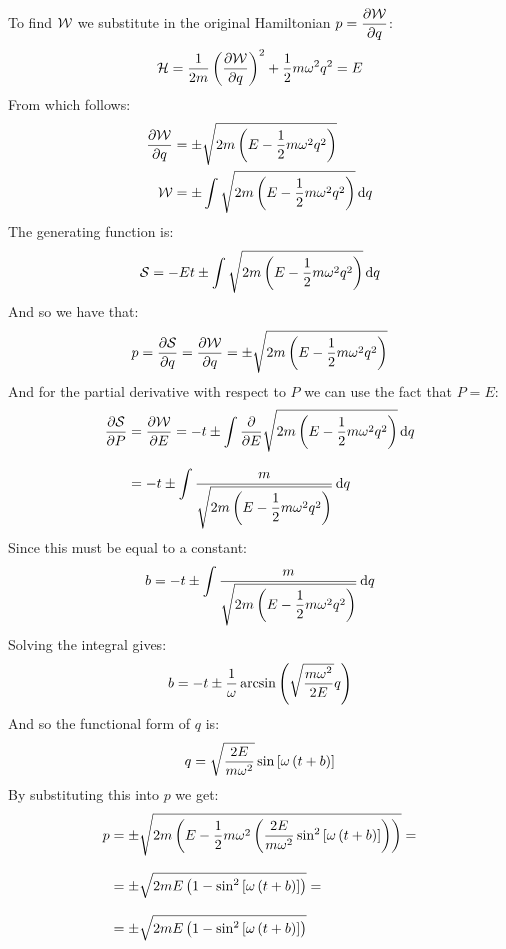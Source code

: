 To find $\mathcal{W}$ we substitute in the original Hamiltonian $p = \pdv{\hamch}{q}$:
\begin{equation}
  \hamfun = \dfrac{1}{2m}\brackets{\pdv{\hamch}{q}}^2 + \dfrac{1}{2}m\omega^2q^2 = E
\end{equation}
From which follows:
\begin{equation}
  \begin{split}
    \pdv{\hamch}{q} &= \pm \sqrt{2m\brackets{E - \dfrac{1}{2}m\omega^2q^2}}\\
    \hamch &= \pm \int  \sqrt{2m\brackets{E - \dfrac{1}{2}m\omega^2q^2}} \dd{q}
  \end{split}
\end{equation}
The generating function is:
\begin{equation}
  \mathcal{S} = -Et \pm \int  \sqrt{2m\left(E - \dfrac{1}{2}m\omega^2q^2\right)} \dd{q}
\end{equation}
And so we have that:
\begin{equation}
  p = \pdv{\action}{q} = \pdv{\hamch}{q} = \pm \sqrt{2m\brackets{E - \dfrac{1}{2}m\omega^2q^2}}
\end{equation}
And for the partial derivative with respect to $P$ we can use the fact that $P=E$:
\begin{equation}
  \begin{split}
    \pdv{\action}{P} &= \pdv{\hamch}{E} = -t \pm \int \pdv{}{E} \sqrt{2m\brackets{E - \dfrac{1}{2}m\omega^2q^2}} \dd{q}\\[8pt]
      &= -t \pm \int \dfrac{m}{\sqrt{2m\brackets{E - \dfrac{1}{2}m\omega^2q^2}}} \dd{q}
  \end{split}
\end{equation}
Since this must be equal to a constant:
\begin{equation}
  b = -t \pm \int \dfrac{m}{\sqrt{2m\left(E - \dfrac{1}{2}m\omega^2q^2\right)}} \dd{q}
\end{equation}
Solving the integral gives:
\begin{equation}
  b = -t \pm \dfrac{1}{\omega} \arcsin \left(\sqrt{\dfrac{m\omega^2}{2E}}q\right)
\end{equation}
And so the functional form of $q$ is:
\begin{equation}
  q = \sqrt{\dfrac{2E}{m\omega^2}} \sin \left[\omega\left( t + b\right)\right]
\end{equation}
By substituting this into $p$ we get:
\begin{equation}
  \begin{split}
    p &= \pm \sqrt{2m\left(E - \dfrac{1}{2}m\omega^2 \left(\dfrac{2E}{m\omega^2} \sin^2 \left[\omega\left( t + b\right)\right]\right)\right)}=\\[8pt]
    &= \pm \sqrt{2mE\left(1 -  \sin^2 \left[\omega\left( t + b\right)\right]\right)}=\\[8pt]
    &= \pm \sqrt{2mE\left(1 -  \sin^2 \left[\omega\left( t + b\right)\right]\right)}
  \end{split}
\end{equation}
